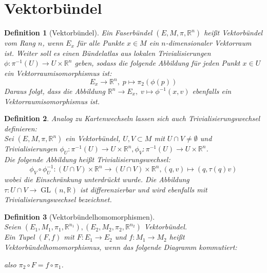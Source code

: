 \documentclass[a4paper]{scrreprt}
\numberwithin{equation}{chapter}
\DeclareMathOperator{\GL}{GL}
\newcommand{\R}{\mathds{R}}
\theoremstyle{plain}
\newtheorem{defn}{Definition}[section]
\begin{document}
	\section{Vektorbündel}
		\begin{defn}[Vektorbündel]
				Ein Faserbündel $(E,M,\pi,\R^n)$ heißt Vektorbündel vom Rang $n$, wenn $E_x$ für alle Punkte $x\in M$ ein $n$-dimensionaler Vektorraum ist. Weiter soll es einen Bündelatlas aus lokalen Trivialisierungen ${\phi:\pi^{-1}(U)\rightarrow U\times \R^n}$ geben, sodass die folgende Abbildung für jeden Punkt $x\in U$ ein Vektorraumisomorphismus ist:
				\begin{equation*}
					E_x\rightarrow \R^n,\; p\mapsto \pi_2(\phi(p))
				\end{equation*}
			Daraus folgt, dass die Abbildung ${\R^n\rightarrow E_x,\; v\mapsto \phi^{-1}(x,v)}$ ebenfalls ein Vektorraumisomorphismus ist.
		\end{defn}
		\begin{defn}
			Analog zu Kartenwechseln lassen sich auch Trivialisierungswechsel definieren:\\
			Sei $(E,M,\pi,\R^n)$ ein Vektorbündel, $U,V\subset M$ mit $U\cap V\neq\emptyset$ und Trivialisierungen ${\phi_U:\pi^{-1}(U)\rightarrow U\times \R^n}, {\phi_V:\pi^{-1}(U)\rightarrow U\times \R^n}$.\\
			Die folgende Abbildung heißt Trivialisierungswechsel:
			\begin{equation*}
				\phi_V\circ\phi_U^{-1}:(U\cap V)\times \R^n\rightarrow (U\cap V)\times \R^n, (q,v)\mapsto (q,\tau(q)v)
			\end{equation*}
			wobei die Einschränkung unterdrückt wurde. Die Abbildung $\tau:U\cap V\rightarrow \GL(n,\R)$ ist differenzierbar und wird ebenfalls mit Trivialisierungswechsel bezeichnet.
		\end{defn}
		\begin{defn}[Vektorbündelhomomorphismen]\hfill\\
			Seien $(E_1,M_1,\pi_1,\R^{n_1}),(E_2,M_2,\pi_2,\R^{n_2})$ Vektorbündel.\\
			Ein Tupel $(F,f)$ mit $F:E_1\rightarrow E_2$ und $f:M_1\rightarrow M_2$ heißt Vektorbündelhomomorphismus, wenn das folgende Diagramm kommutiert:
			\begin{center}
			\end{center}
			also $\pi_2\circ F=f\circ\pi_1$.
		\end{defn}
\end{document}
